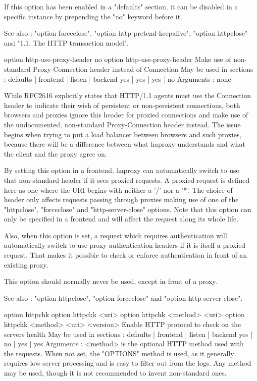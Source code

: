   If this option has been enabled in a "defaults" section, it can be disabled
  in a specific instance by prepending the "no" keyword before it.

  See also : "option forceclose", "option http-pretend-keepalive",
             "option httpclose" and "1.1. The HTTP transaction model".


option http-use-proxy-header
no option http-use-proxy-header
  Make use of non-standard Proxy-Connection header instead of Connection
  May be used in sections :   defaults | frontend | listen | backend
                                 yes   |    yes   |   yes  |   no
  Arguments : none

  While RFC2616 explicitly states that HTTP/1.1 agents must use the
  Connection header to indicate their wish of persistent or non-persistent
  connections, both browsers and proxies ignore this header for proxied
  connections and make use of the undocumented, non-standard Proxy-Connection
  header instead. The issue begins when trying to put a load balancer between
  browsers and such proxies, because there will be a difference between what
  haproxy understands and what the client and the proxy agree on.

  By setting this option in a frontend, haproxy can automatically switch to use
  that non-standard header if it sees proxied requests. A proxied request is
  defined here as one where the URI begins with neither a '/' nor a '*'. The
  choice of header only affects requests passing through proxies making use of
  one of the "httpclose", "forceclose" and "http-server-close" options. Note
  that this option can only be specified in a frontend and will affect the
  request along its whole life.

  Also, when this option is set, a request which requires authentication will
  automatically switch to use proxy authentication headers if it is itself a
  proxied request. That makes it possible to check or enforce authentication in
  front of an existing proxy.

  This option should normally never be used, except in front of a proxy.

  See also : "option httpclose", "option forceclose" and "option
             http-server-close".


option httpchk
option httpchk <uri>
option httpchk <method> <uri>
option httpchk <method> <uri> <version>
  Enable HTTP protocol to check on the servers health
  May be used in sections :   defaults | frontend | listen | backend
                                 yes   |    no    |   yes  |   yes
  Arguments :
    <method>  is the optional HTTP method used with the requests. When not set,
              the "OPTIONS" method is used, as it generally requires low server
              processing and is easy to filter out from the logs. Any method
              may be used, though it is not recommended to invent non-standard
              ones.

